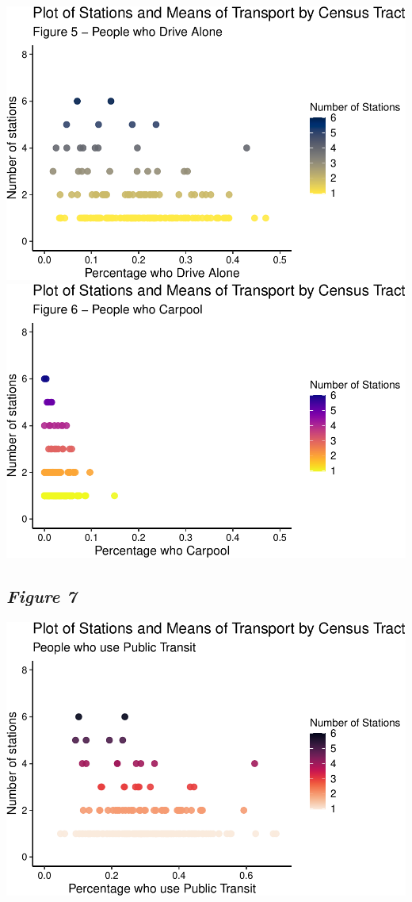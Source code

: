 \documentclass[
  12pt,
]{article}
\begin{document}
\includegraphics{Project_Template_files/figure-latex/data scatterplots driv_ln-1.pdf}
\includegraphics{Project_Template_files/figure-latex/data scatterplots driv_ln-2.pdf}

\hypertarget{figure-7}{%
\subsection{\texorpdfstring{\emph{Figure 7}}{Figure 7}}\label{figure-7}}

\includegraphics{Project_Template_files/figure-latex/data scatterplots pr_pblc-1.pdf}
\end{document}
